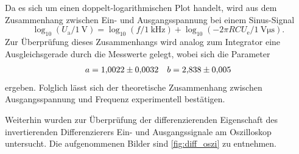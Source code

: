 Da es sich um einen doppelt-logarithmischen Plot handelt, wird aus dem Zusammenhang zwischen Ein- und Ausgangsspannung bei einem Sinus-Signal
\begin{equation*}
  \log_{10} (U_\mathrm{a}/\SI{1}{\volt}) = \log_{10} (f/\SI{1}{\kilo\hertz}) + \log_{10} (- 2 \pi R C U_\mathrm{e}/\SI{1}{\volt\micro\second}).
\end{equation*}
Zur Überprüfung dieses Zusammenhangs wird analog zum Integrator eine Ausgleichsgerade durch die Messwerte gelegt, wobei sich die Parameter
\begin{align*}
  a = \num{1.0022 \pm 0.0032} && b = \num{2.838 \pm 0.005}
\end{align*}
ergeben. Folglich lässt sich der theoretische Zusammenhang zwischen Ausgangsspannung und Frequenz experimentell bestätigen.

Weiterhin wurden zur Überprüfung der differenzierenden Eigenschaft des invertierenden Differenzierers Ein- und Ausgangssignale am Oszilloskop untersucht. Die aufgenommenen Bilder sind \autoref{fig:diff_oszi} zu entnehmen.

